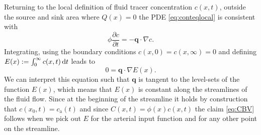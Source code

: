 \documentclass[journal,twocolumn]{IEEEtran}
\newcommand{\ca}{c_\mathrm{a}}
\newcommand{\vq}{\mathbf{q}}
\begin{document}
	Returning to the local definition of fluid tracer concentration $c(x,t)$, outside the source and sink area where $Q(x)=0$ the PDE \eqref{eq:conteqlocal} is consistent with
	\begin{equation}
		\phi\frac{\partial c}{\partial t}  = - \vq \cdot \nabla c.
		\label{eq:1cmodel}
	\end{equation}
	Integrating, using the boundary conditions $c(x,0) = c(x,\infty) = 0$ and defining $E(x):= \int_0^\infty c(x,t) \,\mathrm{d} t$ leads to
	\begin{equation}
		0 = \vq \cdot \nabla  E(x).
		\label{eq:streamlinezero}
	\end{equation}
	We can interpret this equation such that $\vq$ is tangent to the level-sets of the function $E(x)$, which means that $E(x)$ is constant along the streamlines of the fluid flow.
	Since at the beginning of the streamline it holds by construction that $c(x_0,t) = \ca(t)$ and since $C(x,t) = \phi(x) c(x,t)$ the claim \eqref{eq:CBV} follows when we pick out $E$ for the arterial input function and for any other point on the streamline.
\end{document}
